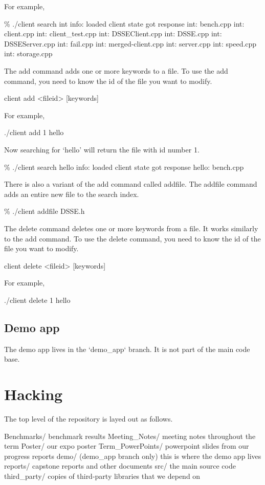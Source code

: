 For example,

    \% ./client search int
    info: loaded client state
    got response
    int: bench.cpp
    int: client.cpp
    int: client_test.cpp
    int: DSSEClient.cpp
    int: DSSE.cpp
    int: DSSEServer.cpp
    int: fail.cpp
    int: merged-client.cpp
    int: server.cpp
    int: speed.cpp
    int: storage.cpp


The add command adds one or more keywords to a file.
To use the add command, you need to know the id of the file you want to modify.

    client add <fileid> [keywords]

For example,

    ./client add 1 hello

Now searching for `hello' will return the file with id number 1.

    \% ./client search hello
    info: loaded client state
    got response
    hello: bench.cpp

There is also a variant of the add command called addfile.
The addfile command adds an entire new file to the search index.

    \% ./client addfile DSSE.h


The delete command deletes one or more keywords from a file.
It works similarly to the add command.
To use the delete command, you need to know the id of the file you want to modify.

    client delete <fileid> [keywords]

For example,

    ./client delete 1 hello

\subsection{Demo app}

The demo app lives in the `demo_app` branch.
It is not part of the main code base.



\section{Hacking}

The top level of the repository is layed out as follows.

    Benchmarks/         benchmark results
    Meeting_Notes/      meeting notes throughout the term
    Poster/             our expo poster
    Term_PowerPoints/   powerpoint slides from our progress reports
    demo/               (demo_app branch only) this is where the demo app lives
    reports/            capstone reports and other documents
    src/                the main source code
    third_party/        copies of third-party libraries that we depend on


